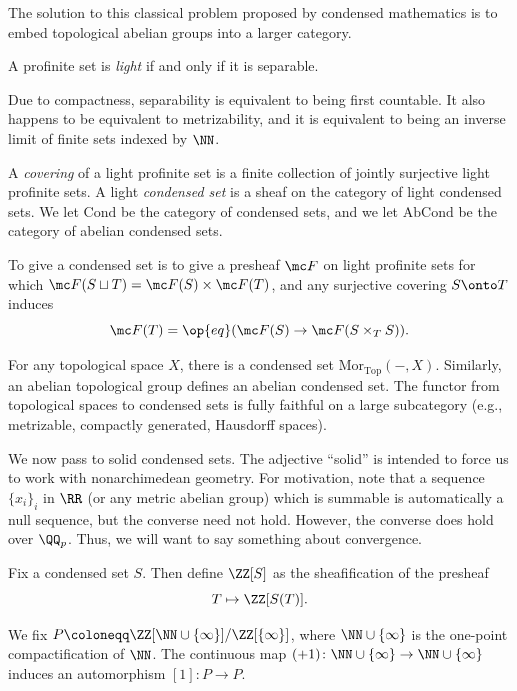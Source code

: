 \documentclass{article}
\begin{document}
The solution to this classical problem proposed by condensed mathematics is to embed topological abelian groups into a larger category.
\begin{definition}[light]
	A profinite set is \textit{light} if and only if it is separable.
\end{definition}
\begin{remark}
	Due to compactness, separability is equivalent to being first countable. It also happens to be equivalent to metrizability, and it is equivalent to being an inverse limit of finite sets indexed by $\NN$.
\end{remark}
\begin{definition}
	A \textit{covering} of a light profinite set is a finite collection of jointly surjective light profinite sets. A light \textit{condensed set} is a sheaf on the category of light condensed sets. We let $\mathrm{Cond}$ be the category of condensed sets, and we let $\mathrm{AbCond}$ be the category of abelian condensed sets.
\end{definition}
\begin{remark}
	To give a condensed set is to give a presheaf $\mc F$ on light profinite sets for which $\mc F(S\sqcup T)=\mc F(S)\times\mc F(T)$, and any surjective covering $S\onto T$ induces
	\[\mc F(T)=\op{eq}(\mc F(S)\to\mc F(S\times_TS)).\]
\end{remark}
\begin{example}
	For any topological space $X$, there is a condensed set $\mathrm{Mor}_{\mathrm{Top}}(-,X)$. Similarly, an abelian topological group defines an abelian condensed set. The functor from topological spaces to condensed sets is fully faithful on a large subcategory (e.g., metrizable, compactly generated, Hausdorff spaces).
\end{example}
We now pass to solid condensed sets. The adjective ``solid'' is intended to force us to work with nonarchimedean geometry. For motivation, note that a sequence $\{x_i\}_i$ in $\RR$ (or any metric abelian group) which is summable is automatically a null sequence, but the converse need not hold. However, the converse does hold over $\QQ_p$. Thus, we will want to say something about convergence.
\begin{notation}
	Fix a condensed set $S$. Then define $\ZZ[S]$ as the sheafification of the presheaf
	\[T\mapsto\ZZ[S(T)].\]
\end{notation}
\begin{notation}
	We fix $P\coloneqq\ZZ[\NN\cup\{\infty\}]/\ZZ[\{\infty\}]$, where $\NN\cup\{\infty\}$ is the one-point compactification of $\NN$. The continuous map $(+1)\colon\NN\cup\{\infty\}\to\NN\cup\{\infty\}$ induces an automorphism $[1]\colon P\to P$.
\end{notation}
\end{document}
